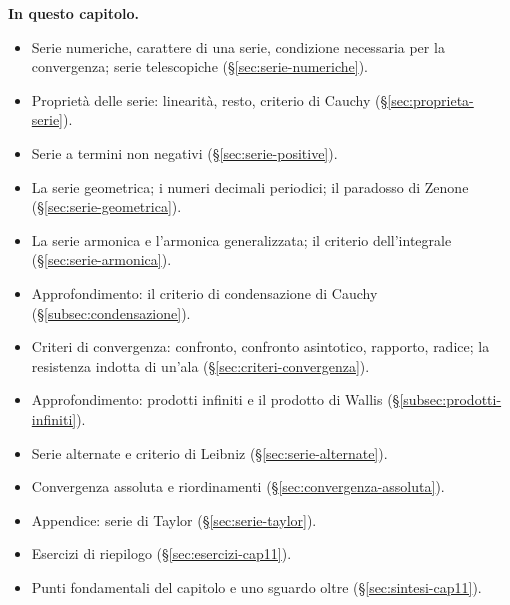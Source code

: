 \medskip
\noindent\textbf{In questo capitolo.}
\begin{itemize}
  \item Serie numeriche, carattere di una serie, condizione necessaria per la
  convergenza; serie telescopiche (\S\ref{sec:serie-numeriche}).
  \item Proprietà delle serie: linearità, resto, criterio di Cauchy
  (\S\ref{sec:proprieta-serie}).
  \item Serie a termini non negativi (\S\ref{sec:serie-positive}).
  \item La serie geometrica; i numeri decimali periodici; il paradosso di Zenone
  (\S\ref{sec:serie-geometrica}).
  \item La serie armonica e l'armonica generalizzata; il criterio dell'integrale
  (\S\ref{sec:serie-armonica}).
  \item Approfondimento: il criterio di condensazione di Cauchy
  (\S\ref{subsec:condensazione}).
  \item Criteri di convergenza: confronto, confronto asintotico, rapporto, radice; la
  resistenza indotta di un'ala (\S\ref{sec:criteri-convergenza}).
  \item Approfondimento: prodotti infiniti e il prodotto di Wallis
  (\S\ref{subsec:prodotti-infiniti}).
  \item Serie alternate e criterio di Leibniz (\S\ref{sec:serie-alternate}).
  \item Convergenza assoluta e riordinamenti (\S\ref{sec:convergenza-assoluta}).
  \item Appendice: serie di Taylor (\S\ref{sec:serie-taylor}).
  \item Esercizi di riepilogo (\S\ref{sec:esercizi-cap11}).
  \item Punti fondamentali del capitolo e uno sguardo oltre (\S\ref{sec:sintesi-cap11}).
\end{itemize}












